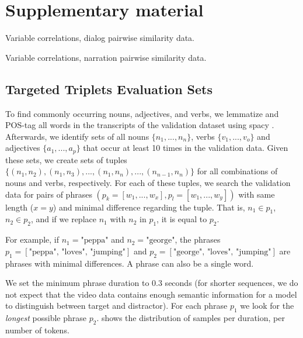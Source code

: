 \appendix

\section{Supplementary material}

\begin{table}
  \centering
  \begin{adjustbox}{angle=90}
    
  \end{adjustbox}
  \caption{Variable correlations, dialog pairwise similarity data.}
  \label{tab:dialogvarcor}
\end{table}
\begin{table}
  \centering
  \begin{adjustbox}{angle=90}
    
  \end{adjustbox}
  \caption{Variable correlations, narration pairwise similarity data.}
  \label{tab:narrationvarcor}
\end{table}


\subsection{Targeted Triplets Evaluation Sets}\label{app:targeted_triplets_eval}

To find commonly occurring nouns, adjectives, and verbs, we lemmatize and POS-tag all words in the transcripts of the validation dataset using spacy \citep{honnibal2020spacy}. Afterwards, we identify sets of all nouns $\{n_1, ..., n_n\}$, verbs $\{v_1, ..., v_o\}$ and adjectives $\{a_1, ..., a_p\}$ that occur at least 10 times in the validation data. Given these sets, we create sets of tuples $\{(n_1, n_2), (n_1, n_3), ..., (n_1, n_n), ...,  (n_{n-1}, n_n)\}$ for all combinations of nouns and verbs, respectively. For each of these tuples, we search the validation data for pairs of phrases $(p_k=[w_1, ..., w_x], p_l=[w_1, ..., w_y])$ with same length ($x=y$) and minimal difference regarding the tuple. That is, $n_1 \in p_1$, $n_2 \in p_2$, and if we replace $n_1$ with $n_2$ in $p_1$, it is equal to $p_2$. 

For example, if $n_1 = \text{"peppa"}$ and $n_2 = \text{"george"}$, the phrases $p_1 = [\text{"peppa", "loves", "jumping"}]$ and $p_2 = [\text{"george", "loves", "jumping"}]$ are phrases with minimal differences. A phrase can also be a single word.

We set the minimum phrase duration to 0.3 seconds (for shorter sequences, we do not expect that the video data contains enough semantic information for a model to distinguish between target and distractor). For each phrase $p_1$ we look for the \textit{longest} possible phrase $p_2$.  shows the distribution of samples per duration,  per number of tokens.

